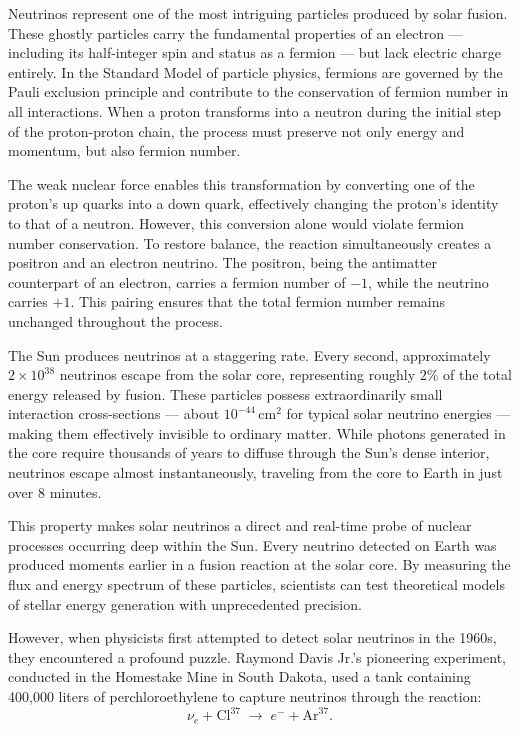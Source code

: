 Neutrinos represent one of the most intriguing particles produced by solar fusion. These ghostly particles carry the fundamental properties of an electron — including its half-integer spin and status as a fermion — but lack electric charge entirely. In the Standard Model of particle physics, fermions are governed by the Pauli exclusion principle and contribute to the conservation of fermion number in all interactions. When a proton transforms into a neutron during the initial step of the proton-proton chain, the process must preserve not only energy and momentum, but also fermion number.

The weak nuclear force enables this transformation by converting one of the proton's up quarks into a down quark, effectively changing the proton's identity to that of a neutron. However, this conversion alone would violate fermion number conservation. To restore balance, the reaction simultaneously creates a positron and an electron neutrino. The positron, being the antimatter counterpart of an electron, carries a fermion number of $-1$, while the neutrino carries $+1$. This pairing ensures that the total fermion number remains unchanged throughout the process.

The Sun produces neutrinos at a staggering rate. Every second, approximately $2 \times 10^{38}$ neutrinos escape from the solar core, representing roughly $2\%$ of the total energy released by fusion. These particles possess extraordinarily small interaction cross-sections — about $10^{-44}\,\text{cm}^2$ for typical solar neutrino energies — making them effectively invisible to ordinary matter. While photons generated in the core require thousands of years to diffuse through the Sun's dense interior, neutrinos escape almost instantaneously, traveling from the core to Earth in just over 8 minutes.

This property makes solar neutrinos a direct and real-time probe of nuclear processes occurring deep within the Sun. Every neutrino detected on Earth was produced moments earlier in a fusion reaction at the solar core. By measuring the flux and energy spectrum of these particles, scientists can test theoretical models of stellar energy generation with unprecedented precision.

However, when physicists first attempted to detect solar neutrinos in the 1960s, they encountered a profound puzzle. Raymond Davis Jr.'s pioneering experiment, conducted in the Homestake Mine in South Dakota, used a tank containing 400,000 liters of perchloroethylene to capture neutrinos through the reaction:
\[
\nu_e + \text{Cl}^{37} \;\to\; e^- + \text{Ar}^{37}.
\]


